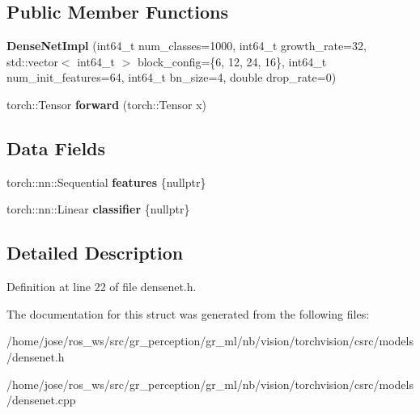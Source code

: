 \subsection*{Public Member Functions}
\begin{DoxyCompactItemize}
\item 
\mbox{\label{structvision_1_1models_1_1DenseNetImpl_a5b20c8dfabdaa2275e92b4f49d6ac41a}} 
{\bfseries Dense\+Net\+Impl} (int64\+\_\+t num\+\_\+classes=1000, int64\+\_\+t growth\+\_\+rate=32, std\+::vector$<$ int64\+\_\+t $>$ block\+\_\+config=\{6, 12, 24, 16\}, int64\+\_\+t num\+\_\+init\+\_\+features=64, int64\+\_\+t bn\+\_\+size=4, double drop\+\_\+rate=0)
\item 
\mbox{\label{structvision_1_1models_1_1DenseNetImpl_a21230fc2b93b64e3fd8333d101bf551f}} 
torch\+::\+Tensor {\bfseries forward} (torch\+::\+Tensor x)
\end{DoxyCompactItemize}
\subsection*{Data Fields}
\begin{DoxyCompactItemize}
\item 
\mbox{\label{structvision_1_1models_1_1DenseNetImpl_a74db34bb94477a012583bd817c72e083}} 
torch\+::nn\+::\+Sequential {\bfseries features} \{nullptr\}
\item 
\mbox{\label{structvision_1_1models_1_1DenseNetImpl_aa9c5dbbe71459938913ee533d97a36e2}} 
torch\+::nn\+::\+Linear {\bfseries classifier} \{nullptr\}
\end{DoxyCompactItemize}


\subsection{Detailed Description}


Definition at line 22 of file densenet.\+h.



The documentation for this struct was generated from the following files\+:\begin{DoxyCompactItemize}
\item 
/home/jose/ros\+\_\+ws/src/gr\+\_\+perception/gr\+\_\+ml/nb/vision/torchvision/csrc/models/densenet.\+h\item 
/home/jose/ros\+\_\+ws/src/gr\+\_\+perception/gr\+\_\+ml/nb/vision/torchvision/csrc/models/densenet.\+cpp\end{DoxyCompactItemize}
